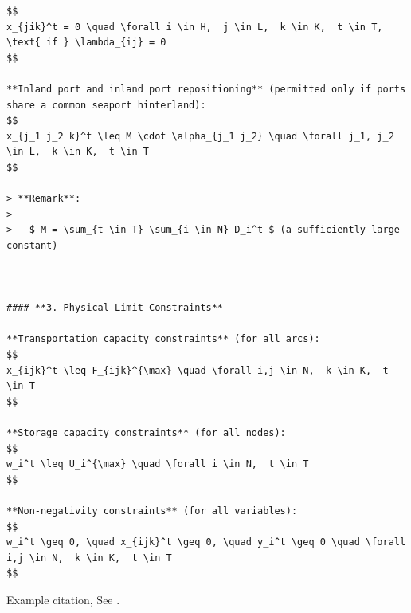 \documentclass[preprint,12pt]{elsarticle}
\begin{document}
\begin{lstlisting}
$$
x_{jik}^t = 0 \quad \forall i \in H,  j \in L,  k \in K,  t \in T,  \text{ if } \lambda_{ij} = 0
$$

**Inland port and inland port repositioning** (permitted only if ports share a common seaport hinterland):
$$
x_{j_1 j_2 k}^t \leq M \cdot \alpha_{j_1 j_2} \quad \forall j_1, j_2 \in L,  k \in K,  t \in T
$$

> **Remark**:
>
> - $ M = \sum_{t \in T} \sum_{i \in N} D_i^t $ (a sufficiently large constant)

---

#### **3. Physical Limit Constraints**

**Transportation capacity constraints** (for all arcs):
$$
x_{ijk}^t \leq F_{ijk}^{\max} \quad \forall i,j \in N,  k \in K,  t \in T
$$

**Storage capacity constraints** (for all nodes):
$$
w_i^t \leq U_i^{\max} \quad \forall i \in N,  t \in T
$$

**Non-negativity constraints** (for all variables):
$$
w_i^t \geq 0, \quad x_{ijk}^t \geq 0, \quad y_i^t \geq 0 \quad \forall i,j \in N,  k \in K,  t \in T
$$

\end{lstlisting}
\newpage

Example citation, See \cite{lamport94}.











\end{document}
